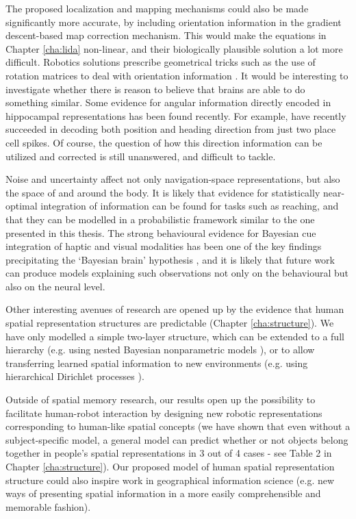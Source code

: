 The proposed localization and mapping mechanisms could also be made significantly more accurate, by including orientation information in the gradient descent-based map correction mechanism. This would make the equations in Chapter \ref{cha:lida} non-linear, and their biologically plausible solution a lot more difficult. Robotics solutions prescribe geometrical tricks such as the use of rotation matrices to deal with orientation information \citep{olson2006fast}. It would be interesting to investigate whether there is reason to believe that brains are able to do something similar. Some evidence for angular information directly encoded in hippocampal representations has been found recently. For example, \cite{huxter2008theta} have recently succeeded in decoding both position and heading direction from just two place cell spikes. Of course, the question of how this direction information can be utilized and corrected is still unanswered, and difficult to tackle.

Noise and uncertainty affect not only navigation-space representations, but also the space of and around the body. It is likely that evidence for statistically near-optimal integration of information can be found for tasks such as reaching, and that they can be modelled in a probabilistic framework similar to the one presented in this thesis. The strong behavioural evidence for Bayesian cue integration of haptic and visual modalities \citep{ernst2002humans} has been one of the key findings precipitating the `Bayesian brain' hypothesis \citep{knill2004bayesian}, and it is likely that future work can produce models explaining such observations not only on the behavioural but also on the neural level.

Other interesting avenues of research are opened up by the evidence that human spatial representation structures are predictable (Chapter \ref{cha:structure}). We have only modelled a simple two-layer structure, which can be extended to a full hierarchy (e.g. using nested Bayesian nonparametric models \citep{blei2010nested}), or to allow transferring learned spatial information to new environments (e.g. using hierarchical Dirichlet processes \citep{teh2006hierarchical}). 

Outside of spatial memory research, our results open up the possibility to facilitate human-robot interaction by designing new robotic representations corresponding to human-like spatial concepts (we have shown that even without a subject-specific model, a general model can predict whether or not objects belong together in people's spatial representations in 3 out of 4 cases - see Table 2 in Chapter \ref{cha:structure}). Our proposed model of human spatial representation structure could also inspire work in geographical information science (e.g. new ways of presenting spatial information in a more easily comprehensible and memorable fashion).




